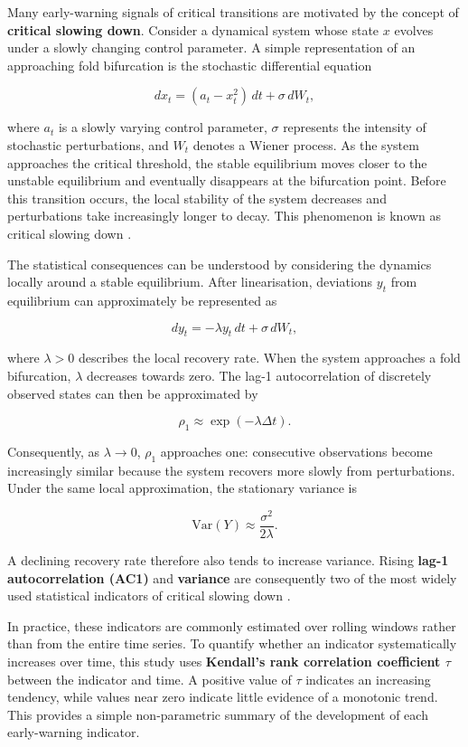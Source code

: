 \documentclass[
]{krantz}
\begin{document}
Many early-warning signals of critical transitions are motivated by the concept of \textbf{critical slowing down}. Consider a dynamical system whose state \(x\) evolves under a slowly changing control parameter. A simple representation of an approaching fold bifurcation is the stochastic differential equation

\[
dx_t = (a_t - x_t^2)\,dt + \sigma\,dW_t,
\]

where \(a_t\) is a slowly varying control parameter, \(\sigma\) represents the intensity of stochastic perturbations, and \(W_t\) denotes a Wiener process. As the system approaches the critical threshold, the stable equilibrium moves closer to the unstable equilibrium and eventually disappears at the bifurcation point. Before this transition occurs, the local stability of the system decreases and perturbations take increasingly longer to decay. This phenomenon is known as critical slowing down \citep{scheffer2009}.

The statistical consequences can be understood by considering the dynamics locally around a stable equilibrium. After linearisation, deviations \(y_t\) from equilibrium can approximately be represented as

\[
dy_t = -\lambda y_t\,dt + \sigma\,dW_t,
\]

where \(\lambda>0\) describes the local recovery rate. When the system approaches a fold bifurcation, \(\lambda\) decreases towards zero. The lag-1 autocorrelation of discretely observed states can then be approximated by

\[
\rho_1 \approx \exp(-\lambda \Delta t).
\]

Consequently, as \(\lambda \rightarrow 0\), \(\rho_1\) approaches one: consecutive observations become increasingly similar because the system recovers more slowly from perturbations. Under the same local approximation, the stationary variance is

\[
\mathrm{Var}(Y) \approx \frac{\sigma^2}{2\lambda}.
\]

A declining recovery rate therefore also tends to increase variance. Rising \textbf{lag-1 autocorrelation (AC1)} and \textbf{variance} are consequently two of the most widely used statistical indicators of critical slowing down \citep{scheffer2009, dakos2012}.

In practice, these indicators are commonly estimated over rolling windows rather than from the entire time series. To quantify whether an indicator systematically increases over time, this study uses \textbf{Kendall's rank correlation coefficient \(\tau\)} between the indicator and time. A positive value of \(\tau\) indicates an increasing tendency, while values near zero indicate little evidence of a monotonic trend. This provides a simple non-parametric summary of the development of each early-warning indicator.
\end{document}
